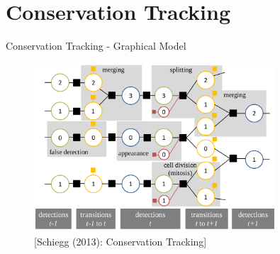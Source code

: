 \section{Conservation Tracking}

\begin{frame}{Conservation Tracking - Graphical Model}
    \begin{figure}
        \centering
        \includegraphics[width=0.8\textwidth]{images/conservation/factor_graph_big3.png}
        \caption{[Schiegg \etal (2013): Conservation Tracking]}
    \end{figure}
\end{frame}

